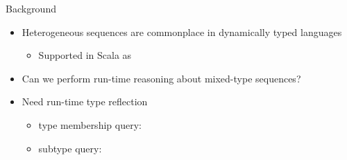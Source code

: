 \begin{frame}{Background}
  \begin{itemize}
  \item Heterogeneous sequences are commonplace in dynamically typed languages
    \begin{itemize}
    \item Supported in Scala as 
    \end{itemize}
  \item Can we perform run-time reasoning about mixed-type sequences?
  \item Need run-time type reflection 
    \begin{itemize}
    \item type membership query:
    \item subtype query: 
    \end{itemize}
  \end{itemize}
\end{frame}
